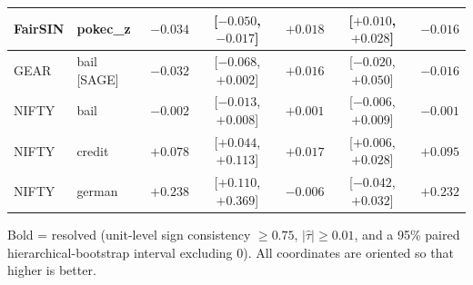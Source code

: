 \begin{table}[t]
\begin{tabular}{llrcrcr}
FairSIN & pokec\_z & $-0.034$ & [$-0.050$, $-0.017$] & $\mathbf{+0.018}$ & [$+0.010$, $+0.028$] & $-0.016$ \\
\midrule
GEAR & bail [SAGE] & $-0.032$ & [$-0.068$, $+0.002$] & $+0.016$ & [$-0.020$, $+0.050$] & $-0.016$ \\
\midrule
NIFTY & bail & $-0.002$ & [$-0.013$, $+0.008$] & $+0.001$ & [$-0.006$, $+0.009$] & $-0.001$ \\
NIFTY & credit & $+0.078$ & [$+0.044$, $+0.113$] & $\mathbf{+0.017}$ & [$+0.006$, $+0.028$] & $+0.095$ \\
NIFTY & german & $+0.238$ & [$+0.110$, $+0.369$] & $-0.006$ & [$-0.042$, $+0.032$] & $+0.232$ \\
\bottomrule
\end{tabular}
\par\smallskip\footnotesize Bold = resolved (unit-level sign consistency $\geq 0.75$, $|\hat\tau| \geq 0.01$, and a 95\% paired hierarchical-bootstrap interval excluding 0). All coordinates are oriented so that higher is better.
\end{table}
